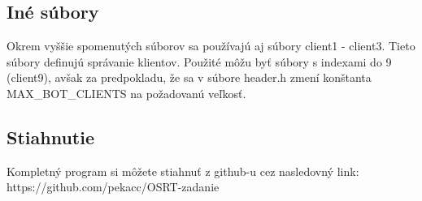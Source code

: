 \documentclass{article}
\begin{document}
\subsection{Iné súbory}
Okrem vyššie spomenutých súborov sa používajú aj súbory client1 - client3. Tieto súbory definujú správanie klientov. Použité môžu byť súbory s indexami do 9 (client9), avšak za predpokladu, že sa v súbore header.h zmení konštanta MAX\_BOT\_CLIENTS na požadovanú veľkosť.
\subsection{Stiahnutie}
Kompletný program si môžete stiahnuť z github-u cez nasledovný link:
\newline
https://github.com/pekacc/OSRT-zadanie
\end{document}
